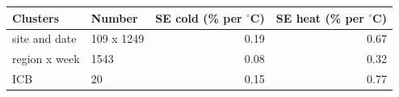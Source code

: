 \begin{tabular}{llrr}
\toprule
Clusters & Number & SE cold (\% per $^\circ$C) & SE heat (\% per $^\circ$C) \\
\midrule
site and date & 109 x 1249 & 0.19 & 0.67 \\
region x week & 1543 & 0.08 & 0.32 \\
ICB & 20 & 0.15 & 0.77 \\
\bottomrule
\end{tabular}
